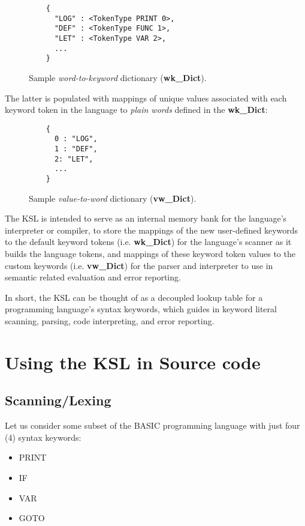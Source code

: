 \documentclass[a4paper,9pt]{article}
\begin{document}
\begin{figure}[ht]
  \centering
  \begin{verbatim}
    {
      "LOG" : <TokenType PRINT 0>, 
      "DEF" : <TokenType FUNC 1>,  
      "LET" : <TokenType VAR 2>, 
      ... 
    }
  \end{verbatim}
  \caption{Sample \textit{word-to-keyword} dictionary (\textbf{wk\_Dict}).}
  \label{fig:wk_Dict}
\end{figure}

The latter is populated with mappings of unique values associated with each keyword token in the language to \textit{plain words} defined in the \textbf{wk\_Dict}:

\begin{figure}[ht]
  \centering
  \begin{verbatim}
    { 
      0 : "LOG", 
      1 : "DEF", 
      2: "LET", 
      ... 
    }
  \end{verbatim}
  \caption{Sample \textit{value-to-word} dictionary (\textbf{vw\_Dict}).}
  \label{fig:vw_Dict}
\end{figure}

The KSL is intended to serve as an internal memory bank for the language's interpreter or compiler, to store the mappings of the new user-defined keywords to the default keyword tokens (i.e. \textbf{wk\_Dict}) for the language's scanner as it builds the language tokens, and mappings of these keyword token values to the custom keywords (i.e. \textbf{vw\_Dict}) for the parser and interpreter to use in semantic related evaluation and error reporting. 

In short, the KSL can be thought of as a decoupled lookup table for a programming language's syntax keywords, which guides in keyword literal scanning, parsing, code interpreting, and error reporting.

\section{Using the KSL in Source code}

\subsection{Scanning/Lexing}

Let us consider some subset of the BASIC \cite{BASIC} programming language with just four (4) syntax keywords:

\begin{itemize}
    \item PRINT
    \item IF
    \item VAR
    \item GOTO
\end{itemize}
\end{document}
